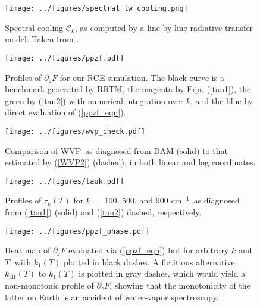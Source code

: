 \documentclass[10pt]{article}
\newcommand{\eqnref}[1]{(\ref{#1})}
\newcommand{\ppz}{\ensuremath{\partial_z}}
\newcommand{\FLW}{\ensuremath{F}}
\newcommand{\cool}{\ensuremath{\mathcal{C}}}
\newcommand{\cminverse}{\ensuremath{\mathrm{cm^{-1}}}}
\newcommand{\WVP}{\ensuremath{\mathrm{WVP}}}
\begin{document}
\begin{figure}[h]
	\begin{center}
			\texttt{[image: ../figures/spectral\_lw\_cooling.png]}
		\caption{Spectral cooling $\cool_k$, as computed by a line-by-line radiative transfer model. Taken from \cite{huang2013}.
		\label{lbl_cooling}
		}
	\end{center}
\end{figure}

\begin{figure}[h]
	\begin{center}
			\texttt{[image: ../figures/ppzf.pdf]}
		\caption{Profiles of $\ppz \FLW$ for our RCE simulation. The black curve is a benchmark generated by RRTM, the magenta by Eqn. \eqnref{tau1}, the green by \eqnref{tau2} with numerical integration over $k$, and the blue by direct evaluation of \eqnref{ppzf_eqn}.
		\label{ppzf}
		}
	\end{center}
\end{figure}


\begin{figure}[h]
	\begin{center}
			\texttt{[image: ../figures/wvp\_check.pdf]}
		\caption{Comparison of \WVP\ as diagnosed from DAM (solid) to that estimated by \eqnref{WVP2} (dashed), in both linear and log coordinates.
		\label{wvp_check}
		}
	\end{center}
\end{figure}

\begin{figure}[h]
	\begin{center}
			\texttt{[image: ../figures/tauk.pdf]}
		\caption{Profiles of $\tau_k(T)$ for $k=$ 100, 500, and 900 \cminverse\ as diagnosed from \eqnref{tau1} (solid) and \eqnref{tau2} dashed, respectively.
		\label{tauk}
		}
	\end{center}
\end{figure}

\begin{figure}[h]
	\begin{center}
			\texttt{[image: ../figures/ppzf\_phase.pdf]}
		\caption{Heat map of  $\ppz F$ evaluated via \eqnref{ppzf_eqn} but for arbitrary $k$ and $T$, with $k_1(T)$ plotted in black dashes. A fictitious alternative $k_{\mathrm{alt}}(T)$ to $k_1(T)$ is plotted in gray dashes, which would yield a non-monotonic profile of $\ppz F$, showing that the monotonicity of the latter on Earth is an accident of water-vapor spectroscopy.
		\label{ppzf_phase}
		}
	\end{center}
\end{figure}
\end{document}
